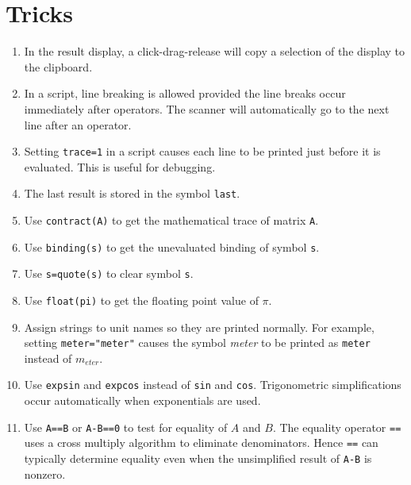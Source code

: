 \section{Tricks}
\begin{enumerate}

\item
In the result display, a click-drag-release will copy a selection of the display to the clipboard.

\item
In a script, line breaking is allowed provided the line breaks occur immediately after operators.
The scanner will automatically go to the next line after an operator.

\item
Setting \verb$trace=1$ in a script causes each line to be printed just before it is evaluated.
This is useful for debugging.

\item
The last result is stored in the symbol \verb$last$.

\item
Use \verb$contract(A)$ to get the mathematical trace of matrix \verb$A$.

\item
Use \verb$binding(s)$ to get the unevaluated binding of symbol \verb$s$.

\item
Use \verb$s=quote(s)$ to clear symbol \verb$s$.

\item
Use \verb$float(pi)$ to get the floating point value of $\pi$.

\item
Assign strings to unit names so they are printed normally.
For example, setting \verb$meter="meter"$ causes the symbol {\it meter}
to be printed as \verb$meter$ instead of $m_{eter}$.

\item
Use \verb$expsin$ and \verb$expcos$ instead of \verb$sin$ and \verb$cos$.
Trigonometric simplifications occur automatically when exponentials are used.

\item
Use \verb$A==B$ or \verb$A-B==0$ to test for equality of $A$ and $B$.
The equality operator \verb$==$ uses a cross multiply algorithm to eliminate denominators.
Hence \verb$==$ can typically determine equality even when the unsimplified result of \verb$A-B$ is nonzero.

\end{enumerate}
